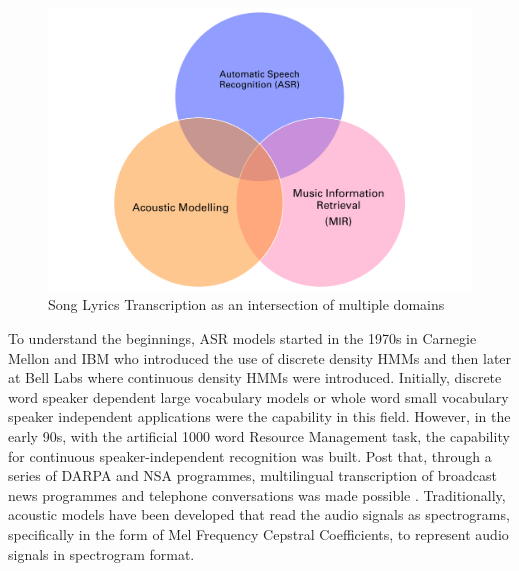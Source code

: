 \begin{figure}[H]
    \centering
    \includegraphics[width=\textwidth]{01-introduction/figures/between_three_domains.pdf}
    \caption{Song Lyrics Transcription as an intersection of multiple domains}%
    \label{fig:setup1}
\end{figure}

To understand the beginnings, ASR models started in the 1970s in Carnegie Mellon and IBM who introduced the use of discrete density HMMs and then later at Bell Labs where continuous density HMMs were introduced. Initially, discrete word speaker dependent large vocabulary models or whole word small vocabulary speaker independent applications were the capability in this field. However, in the early 90s, with the artificial 1000 word Resource Management task, the capability for continuous speaker-independent recognition was built. Post that, through a series of DARPA and NSA programmes, multilingual transcription of broadcast news programmes and telephone conversations was made possible \cite{gales2008application}. Traditionally, acoustic models have been developed that read the audio signals as spectrograms, specifically in the form of Mel Frequency Cepstral Coefficients, to represent audio signals in spectrogram format. 


